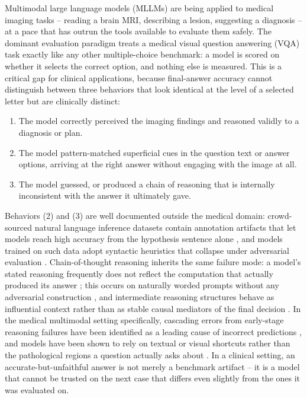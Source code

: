 \documentclass[11pt]{article}
\begin{document}
Multimodal large language models (MLLMs) are being applied to medical imaging tasks -- reading a brain MRI, describing a lesion, suggesting a diagnosis -- at a pace that has outrun the tools available to evaluate them safely. The dominant evaluation paradigm treats a medical visual question answering (VQA) task exactly like any other multiple-choice benchmark: a model is scored on whether it selects the correct option, and nothing else is measured. This is a critical gap for clinical applications, because final-answer accuracy cannot distinguish between three behaviors that look identical at the level of a selected letter but are clinically distinct:

\begin{enumerate}
    \item The model correctly perceived the imaging findings and reasoned validly to a diagnosis or plan.
    \item The model pattern-matched superficial cues in the question text or answer options, arriving at the right answer without engaging with the image at all.
    \item The model guessed, or produced a chain of reasoning that is internally inconsistent with the answer it ultimately gave.
\end{enumerate}

Behaviors (2) and (3) are well documented outside the medical domain: crowd-sourced natural language inference datasets contain annotation artifacts that let models reach high accuracy from the hypothesis sentence alone \citep{gururangan2018annotation}, and models trained on such data adopt syntactic heuristics that collapse under adversarial evaluation \citep{mccoy2019right}. Chain-of-thought reasoning inherits the same failure mode: a model's stated reasoning frequently does not reflect the computation that actually produced its answer \citep{lanham2023measuring}; this occurs on naturally worded prompts without any adversarial construction \citep{arcuschin2025chainofthought}, and intermediate reasoning structures behave as influential context rather than as stable causal mediators of the final decision \citep{somov2026breaking}. In the medical multimodal setting specifically, cascading errors from early-stage reasoning failures have been identified as a leading cause of incorrect predictions \citep{jung2026breaking}, and models have been shown to rely on textual or visual shortcuts rather than the pathological regions a question actually asks about \citep{nguyen2025localizing}. In a clinical setting, an accurate-but-unfaithful answer is not merely a benchmark artifact -- it is a model that cannot be trusted on the next case that differs even slightly from the ones it was evaluated on.
\end{document}
